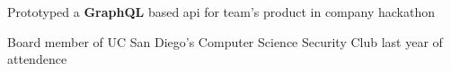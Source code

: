 


\vspace{0.3cm}
\begin{cvitems}
\begin{small}
    \item{ Prototyped a \textbf{GraphQL} based api for team's product in company hackathon}
    \item{ Board member of UC San Diego's Computer Science Security Club last year of attendence}
\end{small}
\end{cvitems}